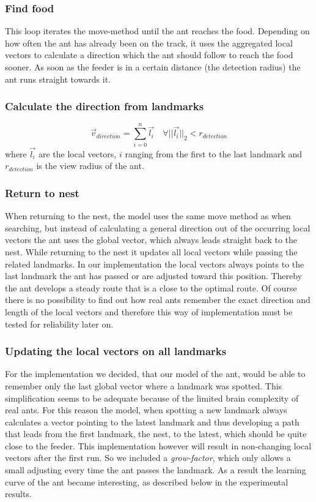 \documentclass[11pt]{article}
\begin{document}
\subsubsection{Find food} This loop iterates the move-method until the ant reaches the food. Depending on how often the ant has already been on the track, it uses the aggregated local vectors to calculate a direction which the ant should follow to reach the food sooner. As soon as the feeder is in a certain distance (the detection radius) the ant runs straight towards it.

\subsubsection{Calculate the direction from landmarks}
\begin{equation}
	\vec{v}_{direction} = \sum_{i=0}^{n}\vec{l_i} \quad \forall ||\vec{l_i}||_2 < r_{detection}
\end{equation}
where $\vec{l_i}$ are the local vectors, $i$ ranging from the first to the last landmark and $r_{detection}$ is the view radius of the ant.

\subsubsection{Return to nest}
When returning to the nest, the model uses the same move method as when 	searching, but instead of calculating a general direction out of the occurring local vectors the ant uses the global vector, which always leads straight back to the nest. While returning to the nest it updates all local vectors while passing the related landmarks. In our implementation the local vectors always points to the last landmark the ant has passed or are adjusted toward this position. Thereby the ant develops a steady route that is a close to the optimal route. Of course there is no possibility to find out how real ants remember the exact direction and length of the local vectors and therefore this way of implementation must be tested for reliability later on.

\subsubsection{Updating the local vectors on all landmarks}

For the implementation we decided, that our model of the ant, would be able to remember only the last global vector where a landmark was spotted. This simplification seems to be adequate because of the limited brain complexity of real ants. For this reason the model, when spotting a new landmark always calculates a vector pointing to the latest landmark and thus developing a path that leads from the first landmark, the nest, to the latest, which should be quite close to the feeder. This implementation however will result in non-changing local vectors after the first run. So we included a \textit{grow-factor}, which only allows a small adjusting every time the ant passes the landmark. As a result the learning curve of the ant became interesting, as described below in the experimental results.
\end{document}
